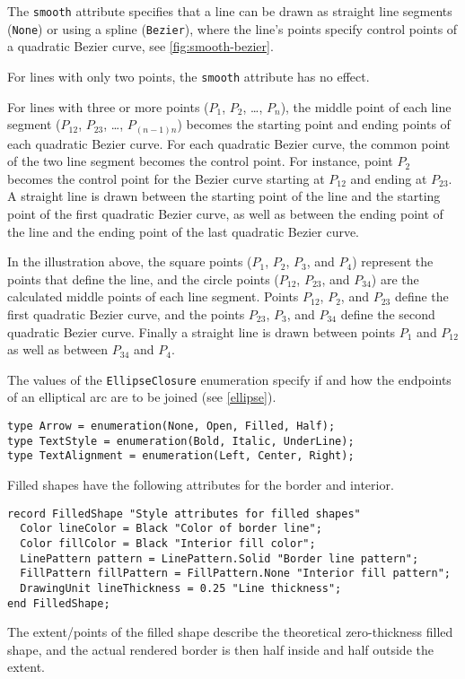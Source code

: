 The \lstinline!smooth! attribute specifies that a line can be drawn as straight line segments (\lstinline!None!) or using a spline (\lstinline!Bezier!), where the line's points specify control points of a quadratic Bezier curve, see \cref{fig:smooth-bezier}.

For lines with only two points, the \lstinline!smooth! attribute has no effect.

For lines with three or more points ($P_{1}$, $P_{2}$, \ldots{}, $P_{n}$), the middle point of each line segment ($P_{12}$, $P_{23}$, \ldots{}, $P_{(n-1)n}$) becomes the starting point and ending
points of each quadratic Bezier curve.  For each quadratic Bezier curve, the common point of the two line segment becomes the control point. For instance, point $P_{2}$ becomes the control point for
the Bezier curve starting at $P_{12}$ and ending at $P_{23}$.  A straight line is drawn between the starting point of the line and the starting point of the first quadratic Bezier curve, as well as
between the ending point of the line and the ending point of the last quadratic Bezier curve.

In the illustration above, the square points ($P_{1}$, $P_{2}$, $P_{3}$, and $P_{4}$) represent the points that define the line, and the circle points ($P_{12}$, $P_{23}$, and $P_{34}$) are the
calculated middle points of each line segment.  Points $P_{12}$, $P_{2}$, and $P_{23}$ define the first quadratic Bezier curve, and the points $P_{23}$, $P_{3}$, and $P_{34}$ define the second
quadratic Bezier curve.  Finally a straight line is drawn between points $P_{1}$ and $P_{12}$ as well as between $P_{34}$ and $P_{4}$.

The values of the \lstinline!EllipseClosure! enumeration specify if and how the endpoints of an elliptical arc are to be joined (see \cref{ellipse}).

\begin{lstlisting}[language=modelica]
type Arrow = enumeration(None, Open, Filled, Half);
type TextStyle = enumeration(Bold, Italic, UnderLine);
type TextAlignment = enumeration(Left, Center, Right);
\end{lstlisting}%

Filled shapes have the following attributes for the border and interior.
\begin{lstlisting}[language=modelica]
record FilledShape "Style attributes for filled shapes"
  Color lineColor = Black "Color of border line";
  Color fillColor = Black "Interior fill color";
  LinePattern pattern = LinePattern.Solid "Border line pattern";
  FillPattern fillPattern = FillPattern.None "Interior fill pattern";
  DrawingUnit lineThickness = 0.25 "Line thickness";
end FilledShape;
\end{lstlisting}%
The extent/points of the filled shape describe the theoretical zero-thickness filled shape, and the actual rendered border is then half inside and half outside the extent.


